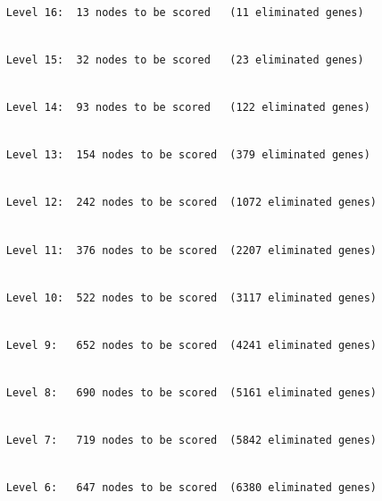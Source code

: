 \documentclass[]{article}
\begin{document}
\begin{verbatim}

     Level 16:  13 nodes to be scored   (11 eliminated genes)
\end{verbatim}

\begin{verbatim}

     Level 15:  32 nodes to be scored   (23 eliminated genes)
\end{verbatim}

\begin{verbatim}

     Level 14:  93 nodes to be scored   (122 eliminated genes)
\end{verbatim}

\begin{verbatim}

     Level 13:  154 nodes to be scored  (379 eliminated genes)
\end{verbatim}

\begin{verbatim}

     Level 12:  242 nodes to be scored  (1072 eliminated genes)
\end{verbatim}

\begin{verbatim}

     Level 11:  376 nodes to be scored  (2207 eliminated genes)
\end{verbatim}

\begin{verbatim}

     Level 10:  522 nodes to be scored  (3117 eliminated genes)
\end{verbatim}

\begin{verbatim}

     Level 9:   652 nodes to be scored  (4241 eliminated genes)
\end{verbatim}

\begin{verbatim}

     Level 8:   690 nodes to be scored  (5161 eliminated genes)
\end{verbatim}

\begin{verbatim}

     Level 7:   719 nodes to be scored  (5842 eliminated genes)
\end{verbatim}

\begin{verbatim}

     Level 6:   647 nodes to be scored  (6380 eliminated genes)
\end{verbatim}
\end{document}

